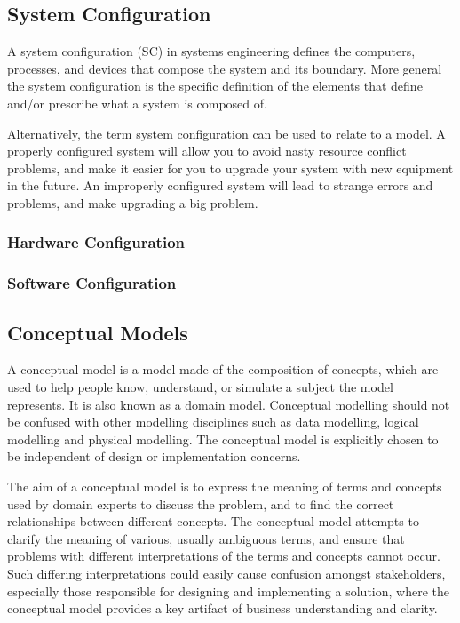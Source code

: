 \subsection{System Configuration}

A system configuration (SC) in systems engineering defines the computers, processes, and devices that compose the system and its boundary. More general the system configuration is the specific definition of the elements that define and/or prescribe what a system is composed of.  

Alternatively, the term system configuration can be used to relate to a model. A properly configured system will allow you to avoid nasty resource conflict problems, and make it easier for you to upgrade your system with new equipment in the future. An improperly configured system will lead to strange errors and problems, and make upgrading a big problem.   

%
\subsubsection{Hardware Configuration}

%
\subsubsection{Software Configuration}
%
\subsection{Conceptual Models}

A conceptual model is a model made of the composition of concepts, which are used to help people know, understand, or simulate a subject the model represents.  It is also known as a domain model. Conceptual modelling should not be confused with other modelling disciplines such as data modelling, logical modelling and physical modelling. The conceptual model is explicitly chosen to be independent of design or implementation concerns.   

The aim of a conceptual model is to express the meaning of terms and concepts used by domain experts to discuss the problem, and to find the correct relationships between different concepts. The conceptual model attempts to clarify the meaning of various, usually ambiguous terms, and ensure that problems with different interpretations of the terms and concepts cannot occur. Such differing interpretations could easily cause confusion amongst stakeholders, especially those responsible for designing and implementing a solution, where the conceptual model provides a key artifact of business understanding and clarity. 
%
